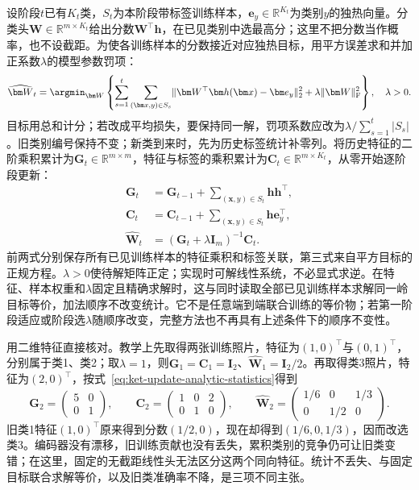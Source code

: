 设阶段$t$已有$K_t$类，$S_t$为本阶段带标签训练样本，$\bm e_y\in\mathbb R^{K_t}$为类别$y$的独热向量。分类头$\bm W\in\mathbb R^{m\times K_t}$给出分数$\bm W^\top\bm h$，在已见类别中选最高分；这里不把分数当作概率，也不设截距。为使各训练样本的分数接近对应独热目标，用平方误差求和并加正系数$\lambda$的模型参数罚项：
\begin{equation}
 \widehat{\bm W}_t
 =\argmin_{\bm W}\left\{
 \sum_{s=1}^{t}\sum_{(\bm x,y)\in S_s}
 \lVert\bm W^\top\bm h(\bm x)-\bm e_y\rVert_2^2
 +\lambda\lVert\bm W\rVert_{\mathrm F}^2\right\},\quad\lambda>0.
 \label{eq:ket-update-analytic-objective}
\end{equation}
目标用总和计分；若改成平均损失，要保持同一解，罚项系数应改为$\lambda/\sum_{s=1}^t|S_s|$。旧类别编号保持不变；新类到来时，先为历史标签统计补零列。将历史特征的二阶乘积累计为$\bm G_t\in\mathbb R^{m\times m}$，特征与标签的乘积累计为$\bm C_t\in\mathbb R^{m\times K_t}$，从零开始逐阶段更新：
\begin{equation}
 \begin{aligned}
 \bm G_t&=\bm G_{t-1}+\sum_{(\bm x,y)\in S_t}\bm h\bm h^\top,\\
 \bm C_t&=\bm C_{t-1}+\sum_{(\bm x,y)\in S_t}\bm h\bm e_y^\top,\\
 \widehat{\bm W}_t&=(\bm G_t+\lambda\bm I_m)^{-1}\bm C_t.
 \end{aligned}
 \label{eq:ket-update-analytic-statistics}
\end{equation}
前两式分别保存所有已见训练样本的特征乘积和标签关联，第三式来自平方目标的正规方程。$\lambda>0$使待解矩阵正定；实现时可解线性系统，不必显式求逆。在特征、样本权重和$\lambda$固定且精确求解时，这与同时读取全部已见训练样本求解同一岭目标等价，加法顺序不改变统计。它不是任意端到端联合训练的等价物；若第一阶段适应或阶段选$\lambda$随顺序改变，完整方法也不再具有上述条件下的顺序不变性。

用二维特征直接核对。教学上先取得两张训练照片，特征为$(1,0)^\top$与$(0,1)^\top$，分别属于类1、类2；取$\lambda=1$，则$\bm G_1=\bm C_1=\bm I_2$、$\widehat{\bm W}_1=\bm I_2/2$。再取得类3照片，特征为$(2,0)^\top$，按式~\eqref{eq:ket-update-analytic-statistics}得到
\[
 \bm G_2=\begin{pmatrix}5&0\\0&1\end{pmatrix},\qquad
 \bm C_2=\begin{pmatrix}1&0&2\\0&1&0\end{pmatrix},\qquad
 \widehat{\bm W}_2=\begin{pmatrix}1/6&0&1/3\\0&1/2&0\end{pmatrix}.
\]
旧类1特征$(1,0)^\top$原来得到分数$(1/2,0)$，现在却得到$(1/6,0,1/3)$，因而改选类3。编码器没有漂移，旧训练贡献也没有丢失，累积类别的竞争仍可让旧类变错；在这里，固定的无截距线性头无法区分这两个同向特征。统计不丢失、与固定目标联合求解等价，以及旧类准确率不降，是三项不同主张。

